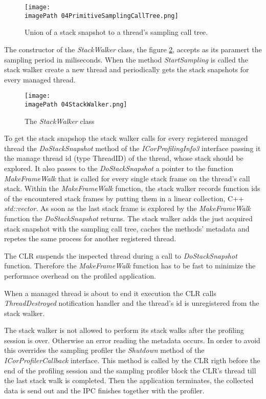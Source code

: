\begin{figure}
	\centering
		\texttt{[image: \\imagePath 04PrimitiveSamplingCallTree.png]}
		\caption{ Union of a stack snapshot to a thread's sampling call tree. }
	\label{fig:04PrimitiveSamplingCallTree}
\end{figure}

The constructor of the \textit{StackWalker} class, the figure \ref{fig:04StackWalker}, accepts as its paramert the sampling period in miliseconds. When the method \textit{StartSampling} is called the stack walker create a new thread and periodically gets the stack snapshots for every managed thread.

\begin{figure}
	\centering
		\texttt{[image: \\imagePath 04StackWalker.png]}
		\caption{ The \textit{StackWalker} class}
	\label{fig:04StackWalker}
\end{figure}


To get the stack snapshop the stack walker calls for every registered managed thread the \textit{DoStackSnapshot} method of the \textit{ICorProfilingInfo3} interface passing it the manage thread id (type ThreadID) of the thread, whose stack should be explored. It also passes to the \textit{DoStackSnapshot} a pointer to the function \textit{MakeFrameWalk} that is called for every single stack frame on the thread's call stack. Within the \textit{MakeFrameWalk} function, the stack walker records function ids of the encountered stack frames by putting them in a linear collection, C++ \textit{std::vector}. As soon as the last stack frame is explored by the \textit{MakeFrameWalk} function the \textit{DoStackSnapshot} returns. The stack walker adds the just acquired stack snapshot with the sampling call tree, caches the methods' metadata and repetes the same process for another registered thread. 

The CLR suspends the inspected thread during a call to \textit{DoStackSnapshot} function. Therefore the \textit{MakeFrameWalk} function has to be fast to minimize the performace overhead on the profiled application.

When a managed thread is about to end it execution the CLR calls \textit{ThreadDestroyed} notification handler and the thread's id is unregistered from the stack walker.

The stack walker is not allowed to perform its stack walks after the profiling session is over. Otherwise an error reading the metadata occurs. In order to avoid this overrides the sampling profiler the \textit{Shutdown} method of the \textit{ICorProfilerCallback} interface. This method is called by the CLR rigth before the end of the profiling session and the sampling profiler block the CLR's thread till the last stack walk is completed. Then the application terminates, the collected data is send out and the IPC finishes together with the profiler.

